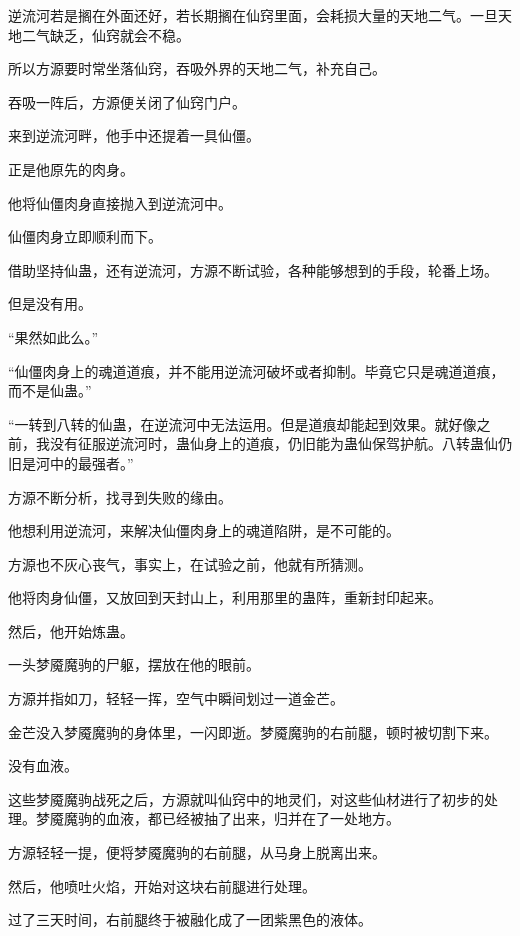 
\begin{this_body}

逆流河若是搁在外面还好，若长期搁在仙窍里面，会耗损大量的天地二气。一旦天地二气缺乏，仙窍就会不稳。

所以方源要时常坐落仙窍，吞吸外界的天地二气，补充自己。

吞吸一阵后，方源便关闭了仙窍门户。

来到逆流河畔，他手中还提着一具仙僵。

正是他原先的肉身。

他将仙僵肉身直接抛入到逆流河中。

仙僵肉身立即顺利而下。

借助坚持仙蛊，还有逆流河，方源不断试验，各种能够想到的手段，轮番上场。

但是没有用。

“果然如此么。”

“仙僵肉身上的魂道道痕，并不能用逆流河破坏或者抑制。毕竟它只是魂道道痕，而不是仙蛊。”

“一转到八转的仙蛊，在逆流河中无法运用。但是道痕却能起到效果。就好像之前，我没有征服逆流河时，蛊仙身上的道痕，仍旧能为蛊仙保驾护航。八转蛊仙仍旧是河中的最强者。”

方源不断分析，找寻到失败的缘由。

他想利用逆流河，来解决仙僵肉身上的魂道陷阱，是不可能的。

方源也不灰心丧气，事实上，在试验之前，他就有所猜测。

他将肉身仙僵，又放回到天封山上，利用那里的蛊阵，重新封印起来。

然后，他开始炼蛊。

一头梦魇魔驹的尸躯，摆放在他的眼前。

方源并指如刀，轻轻一挥，空气中瞬间划过一道金芒。

金芒没入梦魇魔驹的身体里，一闪即逝。梦魇魔驹的右前腿，顿时被切割下来。

没有血液。

这些梦魇魔驹战死之后，方源就叫仙窍中的地灵们，对这些仙材进行了初步的处理。梦魇魔驹的血液，都已经被抽了出来，归并在了一处地方。

方源轻轻一提，便将梦魇魔驹的右前腿，从马身上脱离出来。

然后，他喷吐火焰，开始对这块右前腿进行处理。

过了三天时间，右前腿终于被融化成了一团紫黑色的液体。


\end{this_body}
